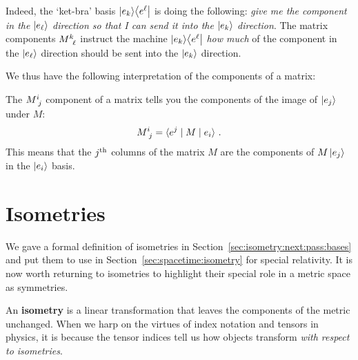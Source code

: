 \documentclass[12pt, oneside]{report}    %
\let\oldsection\section
\def\section{%
  \setcounter{sidenote}{1}%
  \oldsection
}
\begin{document}
Indeed, the `ket-bra' basis $\left|e_k\right\rangle\!\left\langle e^\ell\right|$ is doing the following: \emph{give me the component in the $\left|e_\ell\right\rangle$ direction so that I can send it into the $\left|e_k\right\rangle$ direction}. The matrix components $M\aij{k}{\ell}$ instruct the machine $\left|e_k\right\rangle\!\left\langle e^\ell\right|$ \emph{how much} of the component in the $\left|e_\ell\right\rangle$ direction should be sent into the $\left|e_k\right\rangle$ direction.

We thus have the following interpretation of the components of a matrix:
\begin{bigidea}
The $M\aij{i}{j}$ component of a matrix tells you the components of the image of $\left|e_j\right\rangle$ under $M$:
\begin{align}
    M\aij{i}{j} = \la e^j \mid M \mid e_i \ra \ .
\end{align}
This means that the $j^\textnormal{th}$ columns of the matrix $M$ are the components of $M\left|e_j\right\rangle$ in the $\left|e_i\right\rangle$ basis.
\end{bigidea}




\section{Isometries}
\label{sec:isometries}

We gave a formal definition of isometries in Section~\ref{sec:isometry:next:pass:bases} and put them to use in Section~\ref{sec:spacetime:isometry} for special relativity. It is now worth returning to isometries to highlight their special role in a metric space as symmetries.

An \textbf{isometry} is a linear transformation that leaves the components of the metric unchanged. When we harp on the virtues of index notation and tensors in physics, it is because the tensor indices tell us how objects transform \emph{with respect to isometries}. 
\end{document}
